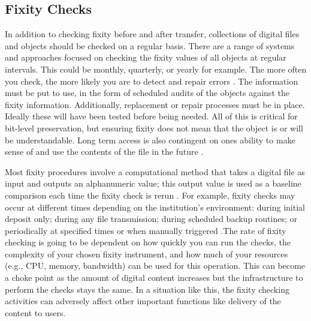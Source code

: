 \subsection{Fixity Checks}
In addition to checking fixity before and after transfer, collections of digital files and objects should be checked on a regular basis. There are a range of systems and approaches focused on checking the fixity values of all objects at regular intervals. This could be monthly, quarterly, or yearly for example. The more often you check, the more likely you are to detect and repair errors \cite[4]{ndsa2014fixity}.
The information must be put to use, in the form of scheduled audits of the objects against the fixity information. Additionally, replacement or repair processes must be in place. Ideally these will have been tested before being needed. All of this is critical for bit-level preservation, but ensuring fixity does not mean that the object is or will be understandable. Long term access is also contingent on ones ability to make sense of and use the contents of the file in the future \cite[2]{ndsa2014fixity}.

Most fixity procedures involve a computational method that takes a digital file as input and outputs an alphanumeric value; this output value is used as a baseline comparison each time the fixity check is rerun \cite[5]{ndsa2017fixity}. 
For example, fixity checks may occur at different times depending on the institution's environment: during initial deposit only; during any file transmission; during scheduled backup routines; or periodically at specified times or when manually triggered \cite[7]{ndsa2017fixity}.\newline The rate of fixity checking is going to be dependent on how quickly you can run the checks, the complexity of your chosen fixity instrument, and how much of your resources (e.g., CPU, memory, bandwidth) can be used for this operation. This can become a choke point as the amount of digital content increases but the infrastructure to perform the checks stays the same. In a situation like this, the fixity checking activities can adversely affect other important functions like delivery of the content to users.
